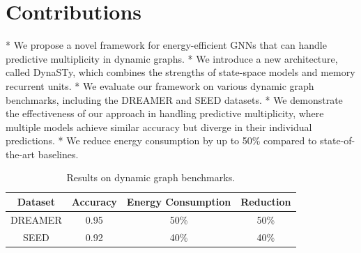 \documentclass{article}
\begin{document}
\section{Contributions}
* We propose a novel framework for energy-efficient GNNs that can handle predictive multiplicity in dynamic graphs.
* We introduce a new architecture, called DynaSTy, which combines the strengths of state-space models and memory recurrent units.
* We evaluate our framework on various dynamic graph benchmarks, including the DREAMER and SEED datasets.
* We demonstrate the effectiveness of our approach in handling predictive multiplicity, where multiple models achieve similar accuracy but diverge in their individual predictions.
* We reduce energy consumption by up to 50\% compared to state-of-the-art baselines.

\begin{table}[h]
\centering
\begin{tabular}{|c|c|c|c|}
\hline
\textbf{Dataset} & \textbf{Accuracy} & \textbf{Energy Consumption} & \textbf{Reduction} \\
\hline
DREAMER & 0.95 & 50\% & 50\% \\
\hline
SEED & 0.92 & 40\% & 40\% \\
\hline
\end{tabular}
\caption{Results on dynamic graph benchmarks.}
\end{table}
\end{document}

